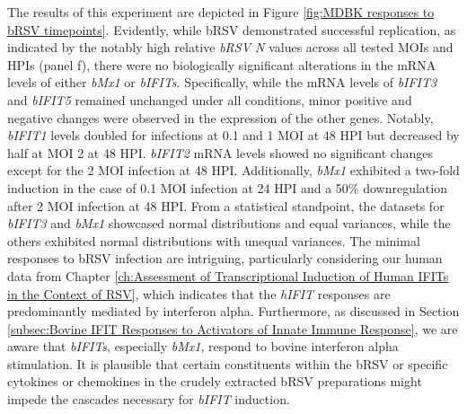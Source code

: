 The results of this experiment are depicted in Figure \ref{fig:MDBK responses to bRSV timepoints}. Evidently, while bRSV demonstrated successful replication, as indicated by the notably high relative \textit{bRSV N} values across all tested MOIs and HPIs (panel f), there were no biologically significant alterations in the mRNA levels of either \textit{bMx1} or \textit{bIFITs}. Specifically, while the mRNA levels of \textit{bIFIT3} and \textit{bIFIT5} remained unchanged under all conditions, minor positive and negative changes were observed in the expression of the other genes. Notably, \textit{bIFIT1} levels doubled for infections at 0.1 and 1 MOI at 48 HPI but decreased by half at MOI 2 at 48 HPI. \textit{bIFIT2} mRNA levels showed no significant changes except for the 2 MOI infection at 48 HPI. Additionally, \textit{bMx1} exhibited a two-fold induction in the case of 0.1 MOI infection at 24 HPI and a 50\% downregulation after 2 MOI infection at 48 HPI. From a statistical standpoint, the datasets for \textit{bIFIT3} and \textit{bMx1} showcased normal distributions and equal variances, while the others exhibited normal distributions with unequal variances. The minimal responses to bRSV infection are intriguing, particularly considering our human data from Chapter \ref{ch:Assessment of Transcriptional Induction of Human IFITs in the Context of RSV}, which indicates that the \textit{hIFIT} responses are predominantly mediated by interferon alpha. Furthermore, as discussed in Section \ref{subsec:Bovine IFIT Responses to Activators of Innate Immune Response}, we are aware that \textit{bIFITs}, especially \textit{bMx1}, respond to bovine interferon alpha stimulation. It is plausible that certain constituents within the bRSV or specific cytokines or chemokines in the crudely extracted bRSV preparations might impede the cascades necessary for \textit{bIFIT} induction.

